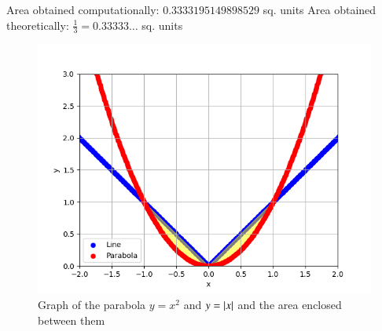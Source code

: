 \documentclass[journal]{IEEEtran}
\begin{document}
Area obtained computationally: $0.3333195149898529$ sq. units\newline
Area obtained theoretically: $\frac{1}{3}=0.33333\dots$ sq. units
\begin{figure}[h!]
   \centering
   \includegraphics[width=1\columnwidth]{figs/fig.png}
   \caption{Graph of the parabola $y=x^2$ and $y=\left\vert x\right\vert$ and the area enclosed between them}
   \label{stemplot}
\end{figure}
\end{document}
